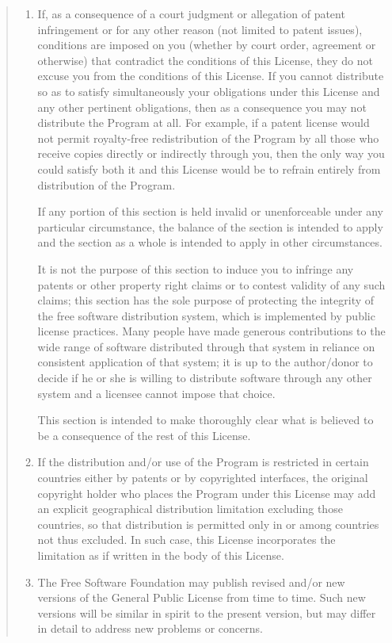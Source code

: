 \documentclass[twoside,11pt]{article}
\renewcommand{\_}{\texttt{\symbol{95}}}
\begin{document}
\begin{quote}
\begin{enumerate}
\item
If, as a consequence of a court judgment or allegation of patent
infringement or for any other reason (not limited to patent issues),
conditions are imposed on you (whether by court order, agreement or
otherwise) that contradict the conditions of this License, they do not
excuse you from the conditions of this License.  If you cannot
distribute so as to satisfy simultaneously your obligations under this
License and any other pertinent obligations, then as a consequence you
may not distribute the Program at all.  For example, if a patent
license would not permit royalty-free redistribution of the Program by
all those who receive copies directly or indirectly through you, then
the only way you could satisfy both it and this License would be to
refrain entirely from distribution of the Program.

If any portion of this section is held invalid or unenforceable under
any particular circumstance, the balance of the section is intended to
apply and the section as a whole is intended to apply in other
circumstances.

It is not the purpose of this section to induce you to infringe any
patents or other property right claims or to contest validity of any
such claims; this section has the sole purpose of protecting the
integrity of the free software distribution system, which is
implemented by public license practices.  Many people have made
generous contributions to the wide range of software distributed
through that system in reliance on consistent application of that
system; it is up to the author/donor to decide if he or she is willing
to distribute software through any other system and a licensee cannot
impose that choice.

This section is intended to make thoroughly clear what is believed to
be a consequence of the rest of this License.

\item
If the distribution and/or use of the Program is restricted in
certain countries either by patents or by copyrighted interfaces, the
original copyright holder who places the Program under this License
may add an explicit geographical distribution limitation excluding
those countries, so that distribution is permitted only in or among
countries not thus excluded.  In such case, this License incorporates
the limitation as if written in the body of this License.

\item
The Free Software Foundation may publish revised and/or new versions
of the General Public License from time to time.  Such new versions will
be similar in spirit to the present version, but may differ in detail to
address new problems or concerns.


\end{enumerate}
\end{quote}
\end{document}
